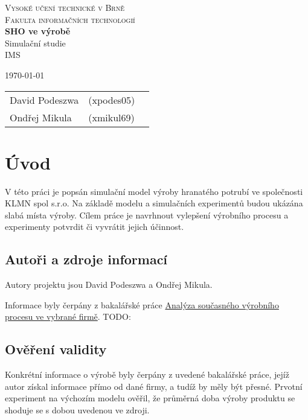 \documentclass[11pt, a4paper]{article}
\begin{document}
\begin{titlepage}
\begin{center}
\Huge
\textsc{Vysoké učení technické v Brně}\\
\huge
\textsc{Fakulta informačních technologií}\\
\LARGE
{\bf SHO ve výrobě}\\Simulační studie\\IMS
{}
\end{center}
\Large
\today\hfill
\begin{tabular}{l l l}
		David Podeszwa & (xpodes05)\\
		Ondřej Mikula & (xmikul69)\\
\end{tabular}
\end{titlepage}

\newpage
\tableofcontents
\newpage


\section{Úvod}
V této práci je popsán simulační model výroby hranatého potrubí ve společnosti KLMN spol s.r.o. Na základě modelu a simulačních experimentů budou ukázána slabá místa výroby. Cílem práce je  navrhnout vylepšení výrobního procesu a
experimenty potvrdit či vyvrátit jejich účinnost.
\subsection{Autoři a zdroje informací}
Autory projektu jsou David Podeszwa a Ondřej Mikula. 


Informace byly čerpány z bakalářské práce \href{http://digilib.k.utb.cz/bitstream/handle/10563/22155/%20ih%C3%A1k_2012_bp.pdf?sequence=1}{Analýza současného výrobního procesu ve 
vybrané firmě}. TODO:%
\subsection{Ověření validity}
Konkrétní informace o výrobě byly čerpány z uvedené bakalářské práce, jejíž autor získal informace přímo od dané firmy, a tudíž by měly být přesné. Prvotní experiment na výchozím modelu ověřil, že průměrná doba výroby produktu se shoduje se s dobou uvedenou ve zdroji.
\end{document}
